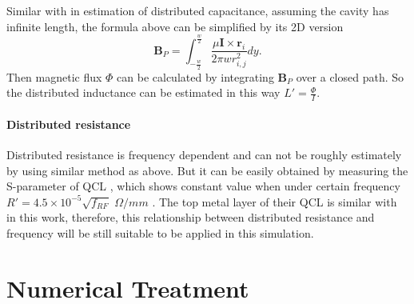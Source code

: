 \documentclass[11pt,final]{scrbook}
\begin{document}
Similar with in estimation of distributed capacitance, assuming the cavity has infinite length, the formula above can be simplified by its 2D version 
\begin{equation}
 \textbf{B}_{P}=\int _{ -\frac { w }{ 2 }  }^{ \frac { w }{ 2 }  }{ { \frac { \mu { \textbf{I} }\times { { \textbf{r} } }_{ i } }{ 2\pi w{ r }_{ i,j }^{ 2 } }  }}  dy. \label{Eqn.:TL_L(2)}
\end{equation}
Then magnetic flux $\Phi$ can be calculated by integrating $ \textbf{B}_{P}$ over a closed path. So the distributed inductance can be estimated in this way $L'=\frac{\Phi }{I}$.
\subsubsection{Distributed resistance}
Distributed resistance is frequency dependent and can not be roughly estimately by using similar method as above. But it can be easily obtained by measuring the S-parameter of QCL \cite{maineult2010microwave}, which shows constant value when under certain frequency $ R'=4.5\times10^{-5}\sqrt{f_{RF}}$  $\Omega/mm$ \citep{maineult2010microwave}. The top metal layer of their QCL is similar with in this work, therefore, this relationship between distributed resistance and frequency will be still suitable to be applied in this simulation.

\chapter{Numerical Treatment}
\end{document}
